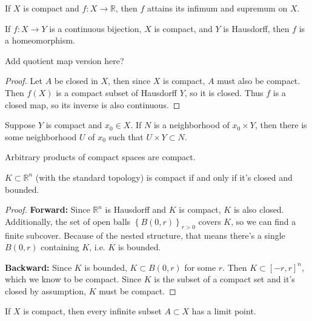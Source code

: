 \documentclass[twoside,10pt]{report}
\begin{document}
\begin{thrm}
If $X$ is compact and $f:X\to \mathbb{R}$, then $f$ attains its infimum and supremum on $X$.
\end{thrm}

\begin{cor}
	If $f:X\to Y$ is a continuous bijection, $X$ is compact, and $Y$ is Hausdorff, then $f$ is a homeomorphism.

	{\color{red}Add quotient map version here?}
\end{cor}
\begin{proof}
	Let $A$ be closed in $X$, then since $X$ is compact, $A$ must also be compact. Then $f(X)$ is a compact subset of Hausdorff $Y$, so it is closed. Thus $f$ is a closed map, so its inverse is also continuous.
\end{proof}

\begin{lem}
	Suppose $Y$ is compact and $x_0 \in X$. If $N$ is a neighborhood of $x_0 \times Y$, then there is some neighborhood $U$ of $x_0$ such that $U \times Y \subset N$.
\end{lem}

\begin{thrm}[Tychonoff]
Arbitrary products of compact spaces are compact.
\end{thrm}

\begin{thrm}
	$K \subset \mathbb{R}^{n}$ (with the standard topology) is compact if and only if it's closed and bounded.
\end{thrm}
\begin{proof}
	\textbf{Forward:} Since $\mathbb{R}^{n}$ is Hausdorff and $K$ is compact, $K$ is also closed. Additionally, the set of open balls $\left\{ B(0,r) \right\}_{r>0}$ covers $K$, so we can find a finite subcover. Because of the nested structure, that means there's a single $B(0,r)$ containing $K$, i.e. $K$ is bounded.

	\textbf{Backward:} Since $K$ is bounded, $K \subset B(0,r)$ for some $r$. Then $K \subset [-r,r]^{n}$, which we know to be compact. Since $K$ is the subset of a compact set and it's closed by assumption, $K$ must be compact.
\end{proof}

\begin{prop}
If $X$ is compact, then every infinite subset $A \subset X$ has a limit point.
\end{prop}
\end{document}
